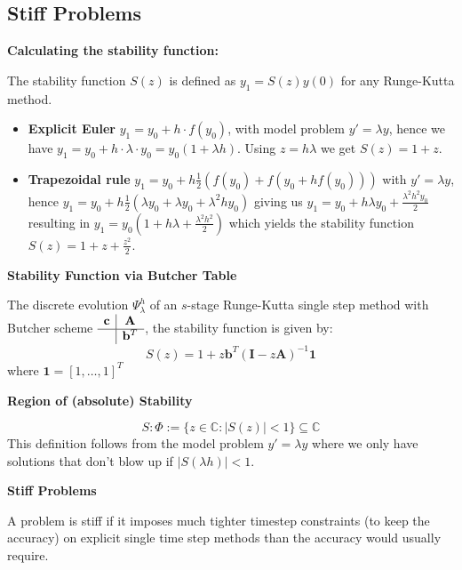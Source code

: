 \documentclass{sciposter}
\renewcommand{\vec}[1]{\mathbf{#1}}
\newenvironment{method}[1]{\begin{mdframed}[backgroundcolor=blue!10,innertopmargin=15pt, innerbottommargin=15pt, nobreak=true]
		\textbf{#1 }
	}
	{ 
	\end{mdframed}
}
\newcommand{\psection}[1]{\par \textbf{\large#1}}
\begin{document}
\begin{multicols}{2}
\section*{Stiff Problems}

\psection{Calculating the stability function:}

The stability function $S(z)$ is defined as $y_1 = S(z)y(0)$ for any Runge-Kutta method.

\begin{itemize}
	\item \textbf{Explicit Euler} $y_1 = y_0 + h\cdot f(y_0)$, with model problem $y' = \lambda y$, hence we have $y_1 = y_0 + h\cdot \lambda \cdot y_0 = y_0 \left(1 + \lambda h\right) $. Using $z = h \lambda$ we get $S(z) = 1 + z$.
	\item \textbf{Trapezoidal rule} $y_1 = y_0 + h\frac{1}{2}(f(y_0) + f(y_0 + hf(y_0)))$ with $y' = \lambda y$, hence $y_1 = y_0 + h\frac{1}{2}(\lambda y_0 + \lambda y_0 + \lambda^2 h y_0)$ giving us $y_1 = y_0 + h\lambda y_0 + \frac{\lambda^2 h^2 y_0}{2}$ resulting in $y_1 = y_0 \left( 1 + h\lambda + \frac{\lambda^2 h^2}{2}\right)$ which yields the stability function $S(z) = 1 + z + \frac{z^2}{2}$.
\end{itemize}


\begin{method}{Stability Function via Butcher Table}
	The discrete evolution $\Psi_\lambda ^h$ of an $s$-stage Runge-Kutta single step method with Butcher scheme 	$\begin{array}
		{c|c}
		\vec{c} &  \vec{A} \\
		\hline
		& \vec{b}^T
	\end{array}$, the stability function is given by:
	$$S(z) = 1 + z\vec{b}^T(\vec{I} - z\vec{A})^{-1}\vec{1}$$
	where $\vec{1} = [1,\ldots,1]^T$
	
\end{method}

\begin{method}{Region of (absolute) Stability}
	$$S:\Phi := \{z \in \mathbb{C} : |S(z)| < 1  \} \subseteq \mathbb{C}$$
	This definition follows from the model problem $y' = \lambda y$ where we only have solutions that don't blow up if $|S(\lambda h)|<1$.
\end{method}

\begin{method}{Stiff Problems}
	A problem is stiff if it imposes much tighter timestep constraints (to keep the accuracy) on explicit single time step methods than the accuracy would usually require.
	

\end{method}
\end{multicols}
\end{document}
